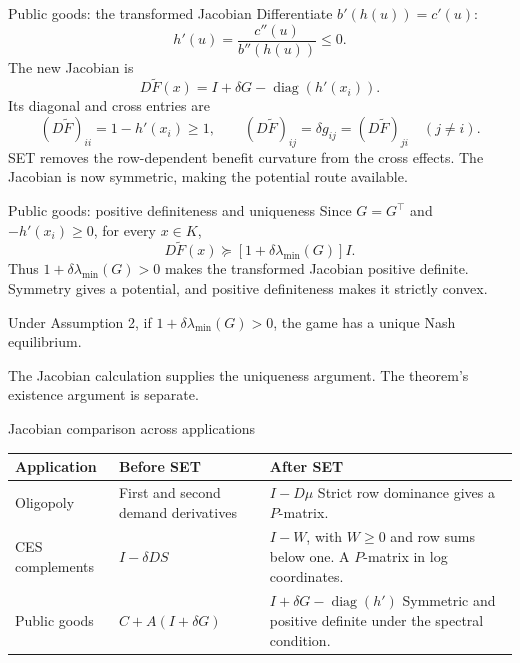 \documentclass[11pt,aspectratio=169]{beamer}
\theoremstyle{plain}
\theoremstyle{definition}
\DeclareMathOperator{\diag}{diag}
\newcommand{\compactmath}{%
 \setlength{\abovedisplayskip}{4pt}\setlength{\belowdisplayskip}{4pt}%
 \setlength{\abovedisplayshortskip}{2pt}\setlength{\belowdisplayshortskip}{4pt}}
\begin{document}
\begin{frame}{Public goods: the transformed Jacobian}
\compactmath
Differentiate $b'(h(u))=c'(u)$:
\[
 h'(u)=\frac{c''(u)}{b''(h(u))}\leq0.
\]
The new Jacobian is
\[
 \boxed{D\widetilde F(x)=I+\delta G-\diag(h'(x_i)).}
\]
Its diagonal and cross entries are
\[
 (D\widetilde F)_{ii}=1-h'(x_i)\geq1,\qquad
 (D\widetilde F)_{ij}=\delta g_{ij}=(D\widetilde F)_{ji}\quad(j\ne i).
\]
SET removes the row-dependent benefit curvature from the cross effects.
The Jacobian is now \alert{symmetric}, making the potential route available.
\end{frame}


\begin{frame}{Public goods: positive definiteness and uniqueness}
\compactmath
Since $G=G^\top$ and $-h'(x_i)\geq0$, for every $x\in K$,
\[
 D\widetilde F(x)\succeq
 [1+\delta\lambda_{\min}(G)]I.
\]
Thus $1+\delta\lambda_{\min}(G)>0$ makes the transformed Jacobian positive definite.
Symmetry gives a potential, and positive definiteness makes it strictly convex.
\setcounter{theorem}{4}
\begin{theorem}
Under Assumption 2, if $1+\delta\lambda_{\min}(G)>0$, the game has a unique
Nash equilibrium.
\end{theorem}
The Jacobian calculation supplies the uniqueness argument.
The theorem's existence argument is separate.
\end{frame}


\begin{frame}{Jacobian comparison across applications}
\small
\begin{center}
\renewcommand{\arraystretch}{1.5}
\begin{tabular}{P{2.25cm}P{4.1cm}P{5.15cm}}
\toprule
Application & Before SET & After SET\\
\midrule
Oligopoly &
First and second demand derivatives &
$I-D\mu$\newline
Strict row dominance gives a $P$-matrix.\\
CES complements &
$I-\delta DS$ &
$I-W$, with $W\geq0$ and row sums below one.\newline
A $P$-matrix in log coordinates.\\
Public goods &
$C+A(I+\delta G)$ &
$I+\delta G-\diag(h')$\newline
Symmetric and positive definite under the spectral condition.\\
\bottomrule
\end{tabular}
\end{center}
\end{frame}
\end{document}

